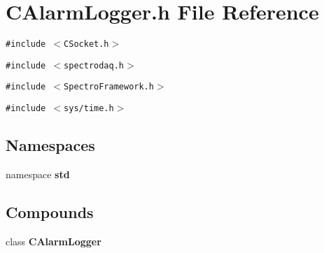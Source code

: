 \section{CAlarm\-Logger.h File Reference}
\label{CAlarmLogger_8h}
{\tt \#include $<$CSocket.h$>$}\par
{\tt \#include $<$spectrodaq.h$>$}\par
{\tt \#include $<$Spectro\-Framework.h$>$}\par
{\tt \#include $<$sys/time.h$>$}\par
\subsection*{Namespaces}
\begin{CompactItemize}
\item 
namespace {\bf std}
\end{CompactItemize}
\subsection*{Compounds}
\begin{CompactItemize}
\item 
class {\bf CAlarm\-Logger}
\end{CompactItemize}
